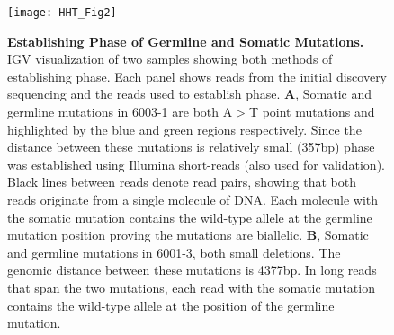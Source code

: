 \begin{figure}[tbp!]
\begin{center}
\texttt{[image: HHT\_Fig2]}
\end{center}

\caption[Establishing Phase of Germline and Somatic Mutations]{\textbf{Establishing Phase of Germline and Somatic Mutations.}\\IGV visualization of two samples showing both methods of establishing phase. Each panel shows reads from the initial discovery sequencing and the reads used to establish phase. \textbf{A}, Somatic and germline mutations in 6003-1 are both A$>$T point mutations and highlighted by the blue and green regions respectively. Since the distance between these mutations is relatively small (357bp) phase was established using Illumina short-reads (also used for validation). Black lines between reads denote read pairs, showing that both reads originate from a single molecule of DNA. Each molecule with the somatic mutation contains the wild-type allele at the germline mutation position proving the mutations are biallelic. \textbf{B}, Somatic and germline mutations in 6001-3, both small deletions. The genomic distance between these mutations is 4377bp. In long reads that span the two mutations, each read with the somatic mutation contains the wild-type allele at the position of the germline mutation.}

\label{HHT_Figure_2}
\end{figure}

